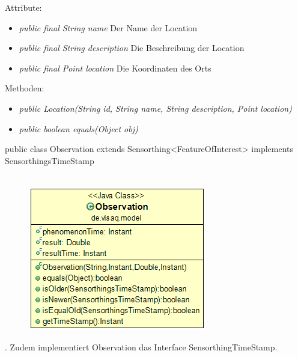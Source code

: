 Attribute:
\begin{itemize} 
	\item \emph{public final String name} Der Name der Location
	\item \emph{public final String description} Die Beschreibung der Location
	\item \emph{public final Point location} Die Koordinaten des Orts
\end{itemize}
Methoden:
\begin{itemize} 
	\item \emph{public Location(String id, String name, String description, Point location)} 
	\item \emph{public boolean equals(Object obj)} 
\end{itemize}


public class Observation extends Sensorthing<FeatureOfInterest> implements SensorthingsTimeStamp
\\\\
\begin{minipage}{0.3\textwidth}
	\begin{figure}[H]
		\includegraphics[scale = 0.5
		]{media/frontend/model/ObservationClass.png}
	\end{figure}
\end{minipage} \hfill
\begin{minipage}{0.6\textwidth}
	. Zudem implementiert Observation das Interface SensorthingTimeStamp.
\end{minipage}


